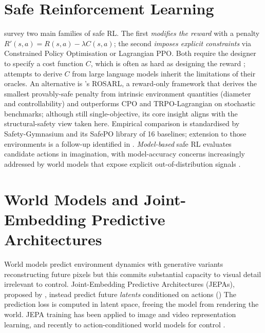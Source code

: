 \documentclass[a4paper,twoside,12pt]{report}
\begin{document}
\section{Safe Reinforcement Learning}

\citet{garcia2015survey} survey two main families of safe RL. The first \emph{modifies the reward} with a penalty $R'(s,a) = R(s,a) - \lambda C(s,a)$; the second \emph{imposes explicit constraints} via Constrained Policy Optimisation \citep{achiam2017cpo} or Lagrangian PPO. Both require the designer to specify a cost function $C$, which is often as hard as designing the reward \citep{skalse2022rewardhacking,fu2025rewardshaping}; attempts to derive $C$ from large language models \citep{kwon2023reward,yu2023languagerewards} inherit the limitations of their oracles. An alternative is \citet{nanguetasse2024rosarl}'s ROSARL, a reward-only framework that derives the smallest provably-safe penalty from intrinsic environment quantities (diameter and controllability) and outperforms CPO and TRPO-Lagrangian on stochastic benchmarks; although still single-objective, its core insight aligns with the structural-safety view taken here. Empirical comparison is standardised by Safety-Gymnasium \citep{ji2023safetygym} and its SafePO library of 16 baselines; extension to those environments is a follow-up identified in . \emph{Model-based} safe RL evaluates candidate actions in imagination, with model-accuracy concerns increasingly addressed by world models that expose explicit out-of-distribution signals \citep{garrido2025intuitive}.

\section{World Models and Joint-Embedding Predictive Architectures}

World models predict environment dynamics \citep{ha2018worldmodels} with generative variants reconstructing future pixels \citep{hafner2020dreamer,hafner2023dreamerv3} but this commits substantial capacity to visual detail irrelevant to control. Joint-Embedding Predictive Architectures (JEPAs), proposed by \citet{lecun2022path}, instead predict future \emph{latents} conditioned on actions () The prediction loss is computed in latent space, freeing the model from rendering the world. JEPA training has been applied to image \citep{assran2023ijepa} and video \citep{bardes2024vjepa} representation learning, and recently to action-conditioned world models for control \citep{sobal2025stresstest,zhou2025dinowm,maes2026lewm}.
\end{document}
